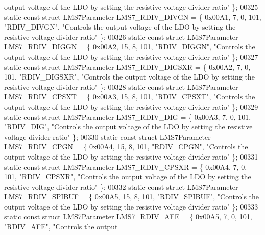 \begin{DoxyCode}
{       output voltage of the LDO by setting the resistive voltage divider ratio"} \};
00325 \textcolor{keyword}{static} \textcolor{keyword}{const} \textcolor{keyword}{struct }LMS7Parameter LMS7_RDIV_DIVGN = \{ 0x00A1, 7, 0, 101, \textcolor{stringliteral}{"RDIV\_DIVGN"}, \textcolor{stringliteral}{"Controls the output
       voltage of the LDO by setting the resistive voltage divider ratio"} \};
00326 \textcolor{keyword}{static} \textcolor{keyword}{const} \textcolor{keyword}{struct }LMS7Parameter LMS7_RDIV_DIGGN = \{ 0x00A2, 15, 8, 101, \textcolor{stringliteral}{"RDIV\_DIGGN"}, \textcolor{stringliteral}{"Controls the
       output voltage of the LDO by setting the resistive voltage divider ratio"} \};
00327 \textcolor{keyword}{static} \textcolor{keyword}{const} \textcolor{keyword}{struct }LMS7Parameter LMS7_RDIV_DIGSXR = \{ 0x00A2, 7, 0, 101, \textcolor{stringliteral}{"RDIV\_DIGSXR"}, \textcolor{stringliteral}{"Controls the
       output voltage of the LDO by setting the resistive voltage divider ratio"} \};
00328 \textcolor{keyword}{static} \textcolor{keyword}{const} \textcolor{keyword}{struct }LMS7Parameter LMS7_RDIV_CPSXT = \{ 0x00A3, 15, 8, 101, \textcolor{stringliteral}{"RDIV\_CPSXT"}, \textcolor{stringliteral}{"Controls the
       output voltage of the LDO by setting the resistive voltage divider ratio"} \};
00329 \textcolor{keyword}{static} \textcolor{keyword}{const} \textcolor{keyword}{struct }LMS7Parameter LMS7_RDIV_DIG = \{ 0x00A3, 7, 0, 101, \textcolor{stringliteral}{"RDIV\_DIG"}, \textcolor{stringliteral}{"Controls the output
       voltage of the LDO by setting the resistive voltage divider ratio"} \};
00330 \textcolor{keyword}{static} \textcolor{keyword}{const} \textcolor{keyword}{struct }LMS7Parameter LMS7_RDIV_CPGN = \{ 0x00A4, 15, 8, 101, \textcolor{stringliteral}{"RDIV\_CPGN"}, \textcolor{stringliteral}{"Controls the output
       voltage of the LDO by setting the resistive voltage divider ratio"} \};
00331 \textcolor{keyword}{static} \textcolor{keyword}{const} \textcolor{keyword}{struct }LMS7Parameter LMS7_RDIV_CPSXR = \{ 0x00A4, 7, 0, 101, \textcolor{stringliteral}{"RDIV\_CPSXR"}, \textcolor{stringliteral}{"Controls the output
       voltage of the LDO by setting the resistive voltage divider ratio"} \};
00332 \textcolor{keyword}{static} \textcolor{keyword}{const} \textcolor{keyword}{struct }LMS7Parameter LMS7_RDIV_SPIBUF = \{ 0x00A5, 15, 8, 101, \textcolor{stringliteral}{"RDIV\_SPIBUF"}, \textcolor{stringliteral}{"Controls the
       output voltage of the LDO by setting the resistive voltage divider ratio"} \};
00333 \textcolor{keyword}{static} \textcolor{keyword}{const} \textcolor{keyword}{struct }LMS7Parameter LMS7_RDIV_AFE = \{ 0x00A5, 7, 0, 101, \textcolor{stringliteral}{"RDIV\_AFE"}, \textcolor{stringliteral}{"Controls the output
}
\end{DoxyCode}
